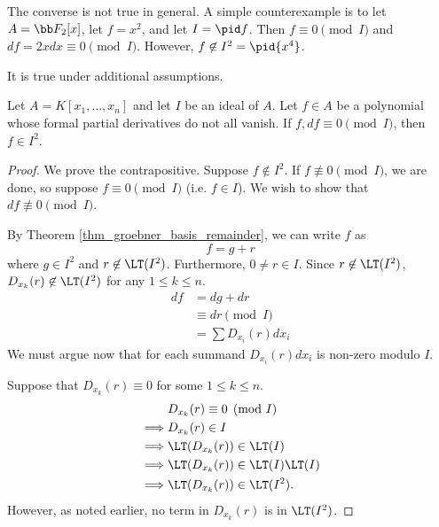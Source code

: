 The converse is not true in general.
A simple counterexample is to let $A = \bb F_2[x]$, let $f = x^2$, and let $I = \pid f$.
Then $f \equiv 0 \pmod I$ and $df = 2xdx \equiv 0 \pmod I$.
However, $f \not\in I^2 = \pid{x^4}$.

It is true under additional assumptions.

\begin{theorem}
  Let $A = K[x_1, \ldots, x_n]$ and let $I$ be an ideal of $A$.
  Let $f \in A$ be a polynomial whose formal partial derivatives do not all vanish.
  If $f, df \equiv 0 \pmod I$, then $f \in I^2$.
\end{theorem}
\begin{proof}
  We prove the contrapositive.
  Suppose $f \not\in I^2$.
  If $f \not\equiv 0 \pmod I$, we are done, so suppose $f \equiv 0 \pmod I$ (i.e. $f \in I$).
  We wish to show that $df \not\equiv 0 \pmod I$.

  By Theorem \ref{thm_groebner_basis_remainder}, we can write $f$ as
  \[ f = g + r \]
  where $g \in I^2$ and $r \not\in \LT(I^2)$. Furthermore, $0 \neq r \in I$.
  Since $r \not\in \LT(I^2)$, $D_{x_k}(r) \not\in \LT(I^2)$ for any $1 \leq k \leq n$.
  \begin{align*}
    df &= dg + dr \\
       &\equiv dr \pmod I \\
       &= \sum D_{x_i}(r)dx_i
  \end{align*}
  We must argue now that for each summand $D_{x_i}(r)dx_i$ is non-zero modulo $I$.
  
  Suppose that $D_{x_k}(r) \equiv 0$ for some $1 \leq k \leq n$.
  \begin{align*}
    & D_{x_k}(r) \equiv 0 \pmod I \\
    \implies & D_{x_k}(r) \in I \\
    \implies & \LT(D_{x_k}(r)) \in \LT(I) \\
    \implies & \LT(D_{x_k}(r)) \in \LT(I)\LT(I) \\
    \implies & \LT(D_{x_k}(r)) \in \LT(I^2).
  \end{align*}
  However, as noted earlier, no term in $D_{x_k}(r)$ is in $\LT(I^2)$.
\end{proof}

